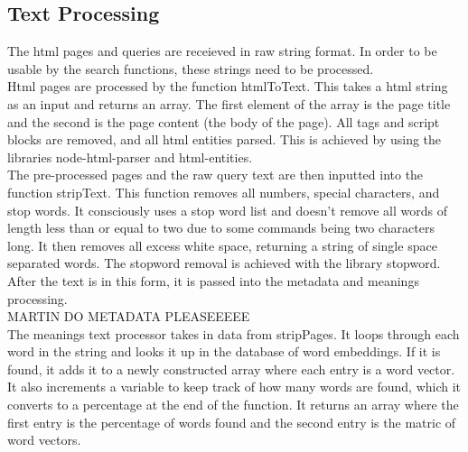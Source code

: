 \subsection{Text Processing}
The html pages and queries are receieved in raw string format. In order to be usable by the search functions, these strings need to be processed. \\
Html pages are processed by the function htmlToText. This takes a html string as an input and returns an array. The first element of the array is the page title and the second is the page content (the body of the page). All tags and script blocks are removed, and all html entities parsed. This is achieved by using the libraries node-html-parser and html-entities. \\ 
The pre-processed pages and the raw query text are then inputted into the function stripText. This function removes all numbers, special characters, and stop words. It consciously uses a stop word list and doesn't remove all words of length less than or equal to two due to some commands being two characters long. It then removes all excess white space, returning a string of single space separated words. The stopword removal is achieved with the library stopword. \\
After the text is in this form, it is passed into the metadata and meanings processing. \\
MARTIN DO METADATA PLEASEEEEE\\
The meanings text processor takes in data from stripPages. It loops through each word in the string and looks it up in the database of word embeddings. If it is found, it adds it to a newly constructed array where each entry is a word vector. It also increments a variable to keep track of how many words are found, which it converts to a percentage at the end of the function. It returns an array where the first entry is the percentage of words found and the second entry is the matric of word vectors.
